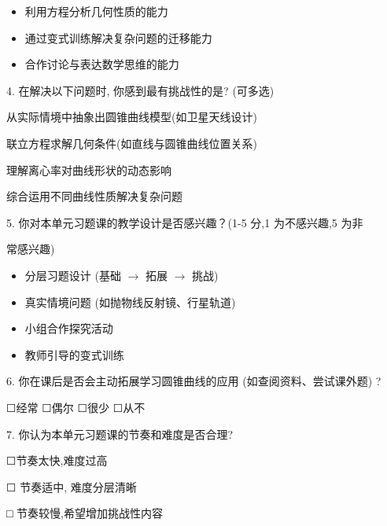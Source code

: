 \documentclass[10pt]{article}
\begin{document}
\begin{itemize}
\item 利用方程分析几何性质的能力
\end{itemize}

\begin{itemize}
\item 通过变式训练解决复杂问题的迁移能力
\end{itemize}

\begin{itemize}
\item 合作讨论与表达数学思维的能力
\end{itemize}

4. 在解决以下问题时, 你感到最有挑战性的是? (可多选)

从实际情境中抽象出圆锥曲线模型(如卫星天线设计)

联立方程求解几何条件(如直线与圆锥曲线位置关系)

理解离心率对曲线形状的动态影响

综合运用不同曲线性质解决复杂问题

5. 你对本单元习题课的教学设计是否感兴趣？(1-5 分,1 为不感兴趣,5 为非

常感兴趣)

\begin{itemize}
\item 分层习题设计 (基础 \(\rightarrow\) 拓展 \(\rightarrow\) 挑战)
\end{itemize}

\begin{itemize}
\item 真实情境问题 (如抛物线反射镜、行星轨道)
\end{itemize}

\begin{itemize}
\item 小组合作探究活动
\end{itemize}

\begin{itemize}
\item 教师引导的变式训练
\end{itemize}

6. 你在课后是否会主动拓展学习圆锥曲线的应用 (如查阅资料、尝试课外题) ?

☐经常 ☐偶尔 ☐很少 ☐从不

7. 你认为本单元习题课的节奏和难度是否合理?

☐节奏太快,难度过高

☐ 节奏适中, 难度分层清晰

□ 节奏较慢,希望增加挑战性内容
\end{document}

